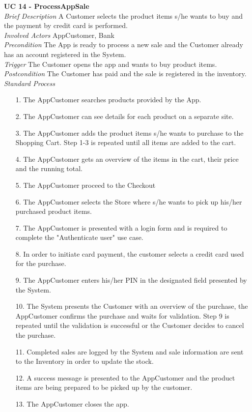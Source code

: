 \textbf{UC 14 - ProcessAppSale}\\
\textit{Brief Description} A Customer selects the product items s/he wants to buy and the payment by credit card is performed.\\ \newline
\textit{Involved Actors} AppCustomer, Bank\\ \newline
\textit{Precondition} The App is ready to process a new sale and the Customer already has an account registered in the System.\\ \newline
\textit{Trigger} The Customer opens the app and wants to buy product items.\\ \newline
\textit{Postcondition} The Customer has paid and the sale is registered in the inventory.\\ \newline
\textit{Standard Process}
\begin{itemize}[leftmargin=*]
	\item[1.] The AppCustomer searches products provided by the App.
	\item[2.] The AppCustomer can see details for each product on a separate site.
	\item[3.] The AppCustomer adds the product items s/he wants to purchase to the Shopping Cart. Step 1-3 is repeated until all items are added to the cart.
	\item[4.] The AppCustomer gets an overview of the items in the cart, their price and the running total.
	\item[5.] The AppCustomer proceed to the Checkout 
	\item[6.] The AppCustomer selects the Store where s/he wants to pick up his/her	purchased product items. 
	\item[7.] The AppCustomer is presented with a login form and is required to complete the "Authenticate user" use case.
	\item[8.] In order to initiate card payment, the customer selects a credit card used for the purchase.
	\item[9.] The AppCustomer enters his/her PIN in the designated field presented by the System.
	\item[10.] The System presents the Customer with an overview of the purchase, the AppCustomer confirms the purchase and waits for validation. Step 9 is repeated until the validation is successful or the Customer decides to cancel the purchase.
	\item[11.] Completed sales are logged by the System and sale information are sent to	the Inventory in order to update the stock.
	\item[12.] A success message is presented to the AppCustomer and the product items
	are being prepared to be picked up by the customer.
	\item[13.] The AppCustomer closes the app.
\end{itemize}

